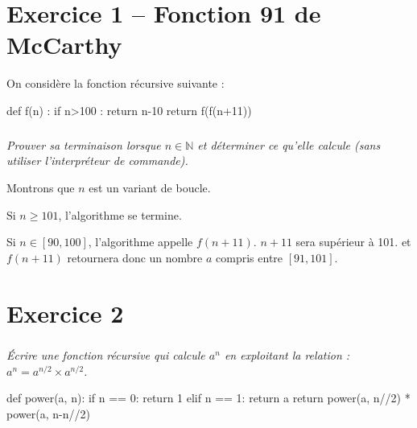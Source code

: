 \documentclass[10pt,fleqn]{book} %
\begin{document}

\vspace{10cm}
\pagestyle{fancy}
\thispagestyle{plain}

\setcounter{secnumdepth}{5}
\def\columnseprulecolor{\color{ocre}}
\setlength{\columnseprule}{0.4pt} 

\ifprof
\else
\begin{multicols}{2}
\fi

\section*{Exercice 1 -- Fonction 91 de McCarthy}
On considère la fonction récursive suivante : 
\begin{py}
\begin{python}
def f(n) :
    if n>100 : 
        return n-10
    return f(f(n+11))
\end{python}
\end{py}

\subparagraph*{} \textit{Prouver sa terminaison lorsque $n\in\mathbb{N}$ et déterminer ce qu'elle calcule (sans utiliser l'interpréteur de commande).}
\ifprof
\begin{corrige}
Montrons que $n$ est un variant de boucle.

Si $n\geq 101$, l'algorithme se termine. 

Si $n\in\left[90, 100\right]$, l'algorithme appelle $f(n+11)$.  $n+11$ sera supérieur à 101. 
 et  $f(n+11)$ retournera donc un nombre $a$ compris entre $\left[91, 101\right]$. 


\end{corrige}
\else
\fi

\section*{Exercice 2}
\setcounter{subparagraph}{0}
\subparagraph{}
\textit{Écrire une fonction récursive qui calcule $a^n$ en exploitant la relation : $a^n=a^{n/2}\times a^{n/2}$.}
\ifprof
\begin{corrige}
\begin{python}
def power(a, n):
    if n == 0:
        return 1
    elif n == 1:
        return a
    return power(a, n//2) * power(a, n-n//2)
\end{python}
\end{corrige}
\else
\fi


\end{multicols}
\end{document}
